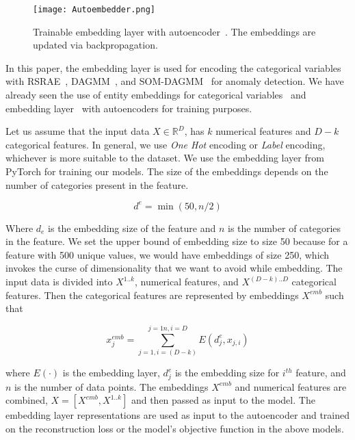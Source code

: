 \documentclass{article}
\begin{document}
\begin{figure}[b]
  \centering
    \texttt{[image: Autoembedder.png]}
    \caption{Trainable embedding layer with autoencoder~\citep{autoembedder}. The embeddings are updated via backpropagation.}
    \label{fig:4.0}
\end{figure}

In this paper, the embedding layer is used for encoding the categorical variables with RSRAE~\citep{rsrae}, DAGMM~\citep{dagmm}, and SOM-DAGMM~\citep{som} for anomaly detection. We have already seen the use of entity embeddings for categorical variables~\citep{entityembed} and embedding layer~\citep{autoembedder} with autoencoders for training purposes. 


Let us assume that the input data $X \in \mathbb{R}^D$, has $k$ numerical features and $D-k$ categorical features. In general, we use \textit{One Hot} encoding or \textit{Label} encoding, whichever is more suitable to the dataset. We use the embedding layer from PyTorch for training our models. The size of the embeddings depends on the number of categories present in the feature.

\begin{equation}
    d^e = \min(50, n/2)
\end{equation}

Where $d_e$ is the embedding size of the feature and $n$ is the number of categories in the feature. We set the upper bound of embedding size to size 50 because for a feature with 500 unique values, we would have embeddings of size 250, which invokes the curse of dimensionality that we want to avoid while embedding. The input data is divided into $X^{1..k}$, numerical features, and $X^{(D-k)..D}$ categorical features. Then the categorical features are represented by embeddings $X^{emb}$ such that

\begin{equation}
   x_j^{emb} =  \sum_{j=1, i=(D-k)}^{j=1n,i=D} E(d_{j}^e, x_{j,i})
\end{equation}

where $E(\cdot)$ is the embedding layer, $d_j^e$ is the embedding size for $i^{th}$ feature, and $n$ is the number of data points. The embeddings $X^{emb}$ and numerical features are combined, $ X = [X^{emb}, X^{1..k} ]$ and then passed as input to the model. The embedding layer representations are used as input to the autoencoder and trained on the reconstruction loss or the model's objective function in the above models.
\end{document}
